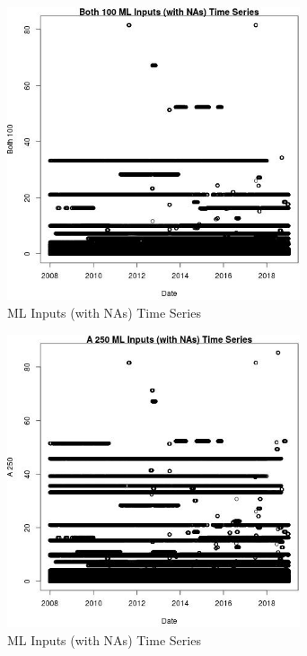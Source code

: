 \begin{figure} 
\centering  
\includegraphics[width=0.77\textwidth]{Code_Outputs/Report_ML_input_PM25_Step4_part_f_de_duplicated_aveswNAs_Both_100vDate.jpg} 
\caption{\label{fig:Report_ML_input_PM25_Step4_part_f_de_duplicated_aveswNAsBoth_100vDate}ML Inputs (with NAs) Time Series} 
\end{figure} 
 

\begin{figure} 
\centering  
\includegraphics[width=0.77\textwidth]{Code_Outputs/Report_ML_input_PM25_Step4_part_f_de_duplicated_aveswNAs_A_250vDate.jpg} 
\caption{\label{fig:Report_ML_input_PM25_Step4_part_f_de_duplicated_aveswNAsA_250vDate}ML Inputs (with NAs) Time Series} 
\end{figure} 
 

